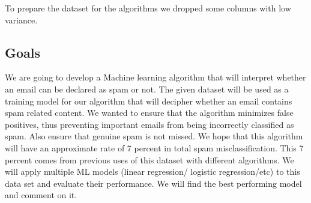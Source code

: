 \documentclass[10pt]{article}
\begin{document}
To prepare the dataset for the algorithms we dropped some columns with low variance. 

\subsection*{Goals}
We are going to develop a Machine learning algorithm that will interpret whether an email can be declared as spam or not. The given dataset will be used as a training model for our algorithm that will decipher whether an email contains spam related content.
We wanted to ensure that the algorithm minimizes false positives, thus preventing important emails from being incorrectly classified as spam. Also ensure that genuine spam is not missed. We hope that this algorithm will have an approximate rate of 7 percent in total spam misclassification.
This 7 percent  comes from previous uses of this dataset with different algorithms. We will apply multiple ML models (linear regression/ logistic regression/etc) to this data set and evaluate their performance. We will find the best performing model and comment on it.
\end{document}
